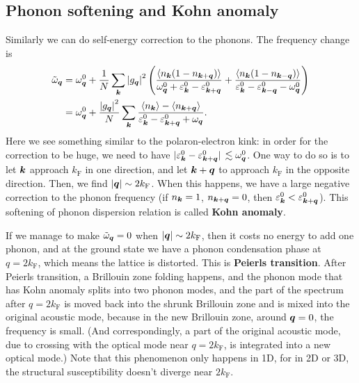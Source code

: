 \documentclass[hyperref, a4paper]{article}
\newcommand*{\concept}[1]{{\textbf{#1}}}
\begin{document}
\subsection{Phonon softening and Kohn anomaly}

Similarly we can do self-energy correction to the phonons.
The frequency change is 
\begin{equation}
    \begin{aligned}
        \tilde{\omega}_{\vb*{q}} &= \omega^0_{\vb*{q}} + \frac{1}{N} \sum_{\vb*{k}} \abs{g_{\vb*{q}}}^2 \left(
            \frac{\expval{n_{\vb*{k}} (1 - n_{\vb*{k} + \vb*{q}})}}{\omega^0_{\vb*{q}} + \varepsilon^0_{\vb*{k}} - \varepsilon^0_{\vb*{k} + \vb*{q}}}
            + \frac{\expval{n_{\vb*{k}} (1 - n_{\vb*{k} - \vb*{q}})}}{\varepsilon^0_{\vb*{k}} - \varepsilon^0_{\vb*{k} - \vb*{q}} - \omega^0_{\vb*{q}}}
        \right) \\
        &= \omega^0_{\vb*{q}} + \frac{\abs{g_{\vb*{q}}}^2}{N} \sum_{\vb*{k}} 
        \frac{\expval{n_{\vb*{k}}} - \expval{n_{\vb*{k} + \vb*{q}}}}{\varepsilon^0_{\vb*{k}} - \varepsilon^0_{\vb*{k} + \vb*{q}} + \omega_{\vb*{q}}}.
    \end{aligned}
\end{equation}
Here we see something similar to the polaron-electron kink:
in order for the correction to be huge, 
we need to have $\abs*{\varepsilon^0_{\vb*{k}} - \varepsilon^0_{\vb*{k} + \vb*{q}}} \lesssim \omega^0_{\vb*{q}}$.
One way to do so is to let $\vb*{k}$ approach $k_\text{F}$ in one direction,
and let $\vb*{k} + \vb*{q}$ to approach $k_{\text{F}}$ in the opposite direction.
Then, we find $\abs{\vb*{q}} \sim 2 k_{\text{F}}$.
When this happens, we have a large negative correction to the phonon frequency 
(if $n_{\vb*{k}} = 1$, $n_{\vb*{k} + \vb*{q}} = 0$, then $\varepsilon^0_{\vb*{k}} < \varepsilon^0_{\vb*{k} + \vb*{q}}$).
This softening of phonon dispersion relation 
is called \concept{Kohn anomaly}.

If we manage to make $\tilde{\omega}_{\vb*{q}} = 0$ when $\abs{\vb*{q}} \sim 2 k_{\text{F}}$,
then it costs no energy to add one phonon, 
and at the ground state we have a phonon condensation phase at $q = 2 k_{\text{F}}$,
which means the lattice is distorted.
This is \concept{Peierls transition}.
After Peierls transition, a Brillouin zone folding happens, 
and the phonon mode that has Kohn anomaly 
splits into two phonon modes, 
and the part of the spectrum after $q = 2 k_{\text{F}}$
is moved back into the shrunk Brillouin zone 
and is mixed into the original acoustic mode,
because in the new Brillouin zone, 
around $\vb*{q} = 0$, the frequency is small.
(And correspondingly, a part of the original acoustic mode, 
due to crossing with the optical mode near $q = 2 k_{\text{F}}$,
is integrated into a new optical mode.)
Note that this phenomenon only happens in 1D, 
for in 2D or 3D, the structural susceptibility 
doesn't diverge near $2 k_{\text{F}}$.
\end{document}
